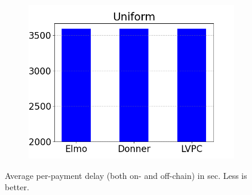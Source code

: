 \begin{figure}
\begin{subfigure}{.3293\textwidth}
  \includegraphics[width=\textwidth]{../simulation/Delays_uniform.png}
  \end{subfigure}
  \caption{Average per-payment delay (both on- and off-chain) in
  sec. Less is better.}
  \label{graph:delays}
  \end{figure}
